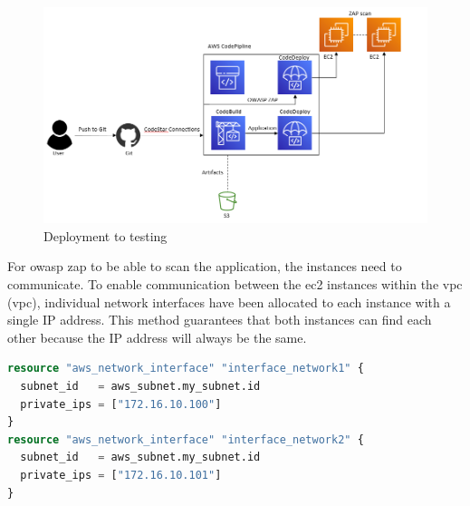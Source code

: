 \vspace{2mm}
\begin{figure}[H]
    \centering
    \includegraphics[width=0.6\columnwidth]{Images/aws-piplin-5.png}
    \caption{Deployment to testing}
    \label{fig: Deployment to testing}
\end{figure}
\newpage
For \acrshort{owasp} \acrshort{zap} to be able to scan the application, the instances need to communicate. To enable communication between the \acrshort{ec2} instances within the \acrlong{vpc} (\acrshort{vpc}), individual network interfaces have been allocated to each instance with a single IP address. This method guarantees that both instances can find each other because the IP address will always be the same.

\vspace{2mm}
\begin{lstlisting}[language=terraform, caption=Allocation of IP adresses, captionpos=b, frame=single]
resource "aws_network_interface" "interface_network1" {
  subnet_id   = aws_subnet.my_subnet.id
  private_ips = ["172.16.10.100"]
}
resource "aws_network_interface" "interface_network2" {
  subnet_id   = aws_subnet.my_subnet.id
  private_ips = ["172.16.10.101"] 
}
\end{lstlisting}

